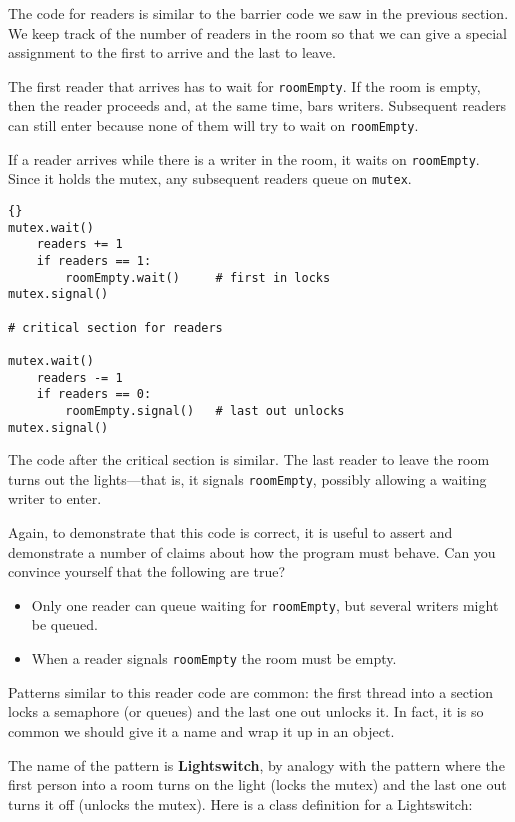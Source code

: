 \documentclass{book}
\begin{document}
The code for readers is similar to the barrier code we
saw in the previous section.  We keep track of the number
of readers in the room so that we can give a special assignment
to the first to arrive and the last to leave.

The first reader that arrives has to wait for {\tt roomEmpty}.
If the room is empty, then the reader proceeds and, at the
same time, bars writers.  Subsequent readers can still enter
because none of them will try to wait on {\tt roomEmpty}.

If a reader arrives while there is a writer in the room,
it waits on {\tt roomEmpty}.  Since it holds the mutex, any
subsequent readers queue on {\tt mutex}.

\begin{lstlisting}[title={Readers solution}]{}
mutex.wait()
    readers += 1
    if readers == 1:
        roomEmpty.wait()     # first in locks
mutex.signal()

# critical section for readers

mutex.wait()
    readers -= 1
    if readers == 0:
        roomEmpty.signal()   # last out unlocks
mutex.signal()
\end{lstlisting}

The code after the critical section is similar.  The last reader
to leave the room turns out the lights---that is, it signals
{\tt roomEmpty}, possibly allowing a waiting writer to enter.

Again, to demonstrate that this code is correct, it is useful
to assert and demonstrate a number of claims about how the program
must behave.  Can you convince yourself that the following are
true?

\begin{itemize}

\item Only one reader can queue waiting for {\tt roomEmpty},
but several writers might be queued.

\item When a reader signals {\tt roomEmpty} the room must
be empty.

\end{itemize}

Patterns similar to this reader code are common: the first thread into
a section locks a semaphore (or queues) and the last one out unlocks
it.  In fact, it is so common we should give it a name and wrap it up
in an object.

The name of the pattern is {\bf Lightswitch}, by analogy with the
pattern where the first person into a room turns on the light (locks
the mutex) and the last one out turns it off (unlocks the mutex).
Here is a class definition for a Lightswitch:
\end{document}
